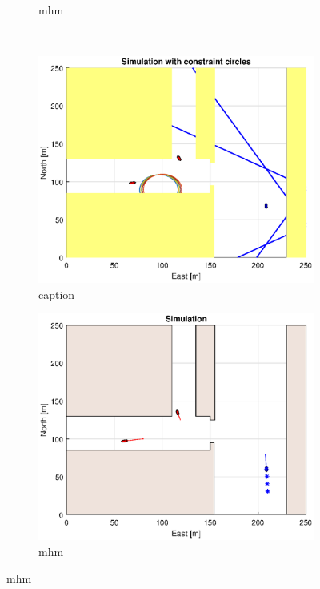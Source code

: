 \begin{figure}[!b]
\begin{subfigure}[b]{0.499\textwidth}
        \caption{mhm}
    \end{subfigure}
    \hfill
    \\
    \begin{subfigure}[b]{0.49\textwidth}
        \centering
        \includegraphics[width=\textwidth]{Images/Figures/Havn1/Simple1_f1_Frame3}
        \caption{caption}
    \end{subfigure}
    \hfill
    \begin{subfigure}[b]{0.499\textwidth}
        \centering
        \includegraphics[width=\textwidth]{Images/Figures/Havn1/Simple1_f600_Frame3}
        \caption{mhm}
    \end{subfigure}
    \hfill
\end{figure}%
